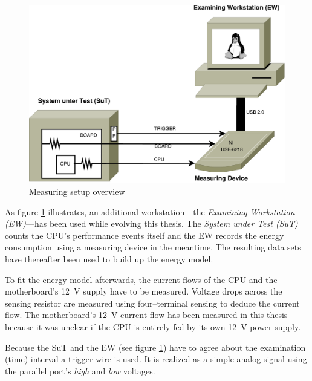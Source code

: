 \label{sec:design}


\label{sec:big-pic}

\begin{figure}
  \centering
    \includegraphics[width=\textwidth]{fig/measuring-overview.eps}
  \caption{Measuring setup overview}
  \label{fig:overview}
\end{figure}

As figure \ref{fig:overview} illustrates, an additional workstation---the
\emph{Examining Workstation (EW)}---has been used while evolving this thesis.
The \emph{System under Test (SuT)} counts the CPU's performance events itself
and the EW records the energy consumption using a measuring device in the
meantime. The resulting data sets have thereafter been used to build up the
energy model.


\label{sec:measuring-setup}

To fit the energy model afterwards, the current flows of the CPU and the
motherboard's \SI{12}{\volt} supply have to be measured. Voltage drops across
the sensing resistor are measured using four--terminal sensing \cite{wiki:FTS}
to deduce the current flow. The motherboard's \SI{12}{\volt} current flow has
been measured in this thesis because it was unclear if the CPU is entirely fed
by its own \SI{12}{\volt} power supply.

Because the SuT and the EW (see figure \ref{fig:overview}) have to agree about
the examination (time) interval a trigger wire is used. It is realized as a
simple analog signal using the parallel port's \emph{high} and \emph{low}
voltages.

